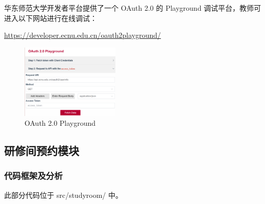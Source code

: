\documentclass[14pt,a4paper,UTF8,twoside]{article}
\renewcommand{\texttt}[1]{{\color{blue}\ttfamily#1}}
\begin{document}
华东师范大学开发者平台提供了一个 OAuth 2.0 的 Playground 调试平台，教师可进入以下网站进行在线调试：

\href{https://developer.ecnu.edu.cn/oauth2playground/}{\underline{https://developer.ecnu.edu.cn/oauth2playground/}}

\begin{figure}[H]
    \centering
    \includegraphics[width=0.42\textwidth]{img/OAuth2Playground.png}
    \caption{OAuth 2.0 Playground}
    \label{fig:oauth2_playground}
\end{figure}

\newpage{}

\subsection{研修间预约模块}

\subsubsection{代码框架及分析}

此部分代码位于 \texttt{src/studyroom/} 中。
\end{document}
